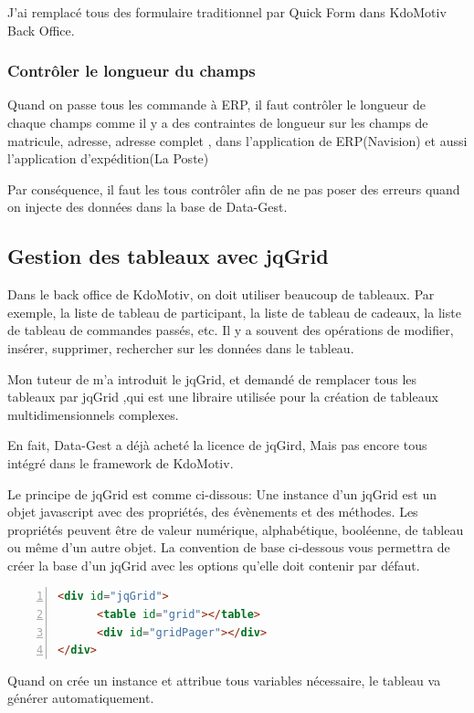 J'ai remplacé tous des formulaire traditionnel par Quick Form dans KdoMotiv Back Office.

\subsubsection{Contrôler le longueur du champs}
Quand on passe tous les commande à ERP, il faut contrôler le longueur de chaque champs comme il y a des contraintes de longueur sur les champs de matricule, adresse, adresse complet , dans l'application de ERP(Navision) et aussi l'application d'expédition(La Poste)

Par conséquence, il faut les tous contrôler afin de ne pas poser des erreurs quand on injecte des données dans la base de Data-Gest.

\subsection{Gestion des tableaux avec jqGrid}
Dans le back office de KdoMotiv, on doit utiliser beaucoup de tableaux. Par exemple, la liste de tableau de participant, la liste de tableau de cadeaux, la liste de tableau de commandes passés, etc. Il y a souvent des opérations de modifier, insérer, supprimer, rechercher sur les données dans le tableau.

Mon tuteur de m'a introduit le jqGrid, et demandé de remplacer tous les tableaux par jqGrid ,qui est une libraire utilisée pour la création de tableaux multidimensionnels complexes.

En fait, Data-Gest a déjà acheté la licence de jqGird,  Mais pas encore tous intégré dans le framework de KdoMotiv. 

Le principe de jqGrid est comme ci-dissous:
Une instance d’un jqGrid est un objet javascript avec des propriétés, des évènements et des méthodes. Les propriétés peuvent être de valeur numérique, alphabétique, booléenne, de  tableau ou même d’un autre objet. La convention de base ci-dessous vous permettra de créer la base d’un jqGrid avec les options qu’elle doit contenir par défaut.

\begin{lstlisting}[language= html, numbers=left, numberstyle=\tiny,  frame=shadowbox]
<div id="jqGrid">
      <table id="grid"></table>
      <div id="gridPager"></div>
</div>
\end{lstlisting}

Quand on crée un instance et attribue tous variables nécessaire, le tableau va générer automatiquement.

